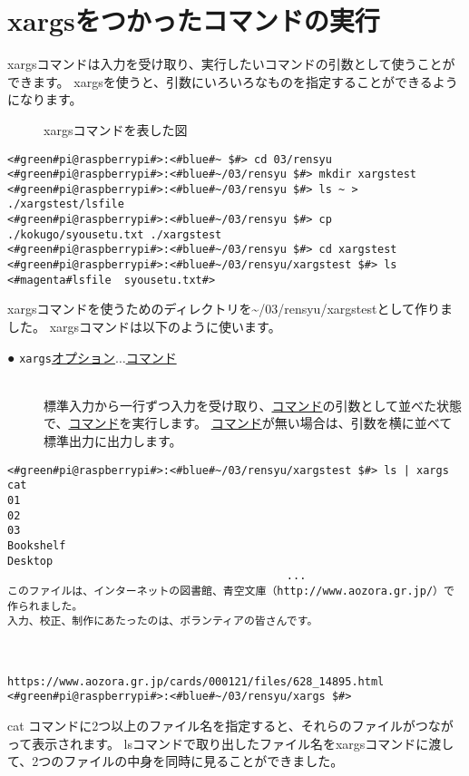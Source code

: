 \newpage
\section{xargsをつかったコマンドの実行}
xargsコマンドは入力を受け取り、実行したいコマンドの引数として使うことができます。
xargsを使うと、引数にいろいろなものを指定することができるようになります。
\begin{figure}[h]
    \centering
    
    \caption{xargsコマンドを表した図}
    \label{ch03:xargs_command}
\end{figure}
\begin{lstlisting}[caption=xargsコマンドを使う準備をする]
<#green#pi@raspberrypi#>:<#blue#~ $#> cd 03/rensyu
<#green#pi@raspberrypi#>:<#blue#~/03/rensyu $#> mkdir xargstest
<#green#pi@raspberrypi#>:<#blue#~/03/rensyu $#> ls ~ > ./xargstest/lsfile
<#green#pi@raspberrypi#>:<#blue#~/03/rensyu $#> cp ./kokugo/syousetu.txt ./xargstest
<#green#pi@raspberrypi#>:<#blue#~/03/rensyu $#> cd xargstest
<#green#pi@raspberrypi#>:<#blue#~/03/rensyu/xargstest $#> ls
<#magenta#lsfile  syousetu.txt#>
\end{lstlisting}
xargsコマンドを使うためのディレクトリを\textasciitilde /03/rensyu/xargstestとして作りました。
xargsコマンドは以下のように使います。

\begin{description}
    \item[● \texttt{xargs}\textvisiblespace \underline{オプション}$\ldots$\textvisiblespace \underline{コマンド}]\mbox{}\\
    標準入力から一行ずつ入力を受け取り、\underline{コマンド}の引数として並べた状態で、\underline{コマンド}を実行します。
    \underline{コマンド}が無い場合は、引数を横に並べて標準出力に出力します。
\end{description}


\begin{lstlisting}[caption=xargsコマンドを使ってcatコマンドを使う]
<#green#pi@raspberrypi#>:<#blue#~/03/rensyu/xargstest $#> ls | xargs cat
01
02
03
Bookshelf
Desktop
                                           ...
このファイルは、インターネットの図書館、青空文庫（http://www.aozora.gr.jp/）で作られました。
入力、校正、制作にあたったのは、ボランティアの皆さんです。



https://www.aozora.gr.jp/cards/000121/files/628_14895.html
<#green#pi@raspberrypi#>:<#blue#~/03/rensyu/xargs $#>
\end{lstlisting}
cat コマンドに2つ以上のファイル名を指定すると、それらのファイルがつながって表示されます。
lsコマンドで取り出したファイル名をxargsコマンドに渡して、2つのファイルの中身を同時に見ることができました。


